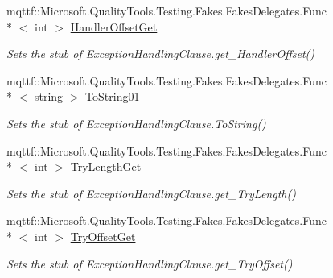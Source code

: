 \begin{DoxyCompactItemize}
mqttf\-::\-Microsoft.\-Quality\-Tools.\-Testing.\-Fakes.\-Fakes\-Delegates.\-Func\\*
$<$ int $>$ \hyperlink{class_system_1_1_reflection_1_1_fakes_1_1_stub_exception_handling_clause_a54a2071a343a4f6de4ace5659866e5ae}{Handler\-Offset\-Get}
\begin{DoxyCompactList}\small\item\em Sets the stub of Exception\-Handling\-Clause.\-get\-\_\-\-Handler\-Offset()\end{DoxyCompactList}\item 
mqttf\-::\-Microsoft.\-Quality\-Tools.\-Testing.\-Fakes.\-Fakes\-Delegates.\-Func\\*
$<$ string $>$ \hyperlink{class_system_1_1_reflection_1_1_fakes_1_1_stub_exception_handling_clause_a6a1c7f07c3ad82a14a007d2c2dda21f8}{To\-String01}
\begin{DoxyCompactList}\small\item\em Sets the stub of Exception\-Handling\-Clause.\-To\-String()\end{DoxyCompactList}\item 
mqttf\-::\-Microsoft.\-Quality\-Tools.\-Testing.\-Fakes.\-Fakes\-Delegates.\-Func\\*
$<$ int $>$ \hyperlink{class_system_1_1_reflection_1_1_fakes_1_1_stub_exception_handling_clause_a64382657fc14dff034dad85c9c6d36dd}{Try\-Length\-Get}
\begin{DoxyCompactList}\small\item\em Sets the stub of Exception\-Handling\-Clause.\-get\-\_\-\-Try\-Length()\end{DoxyCompactList}\item 
mqttf\-::\-Microsoft.\-Quality\-Tools.\-Testing.\-Fakes.\-Fakes\-Delegates.\-Func\\*
$<$ int $>$ \hyperlink{class_system_1_1_reflection_1_1_fakes_1_1_stub_exception_handling_clause_a8bb9a8e77b3447f15d63638e8c54bcb2}{Try\-Offset\-Get}
\begin{DoxyCompactList}\small\item\em Sets the stub of Exception\-Handling\-Clause.\-get\-\_\-\-Try\-Offset()\end{DoxyCompactList}\end{DoxyCompactItemize}
